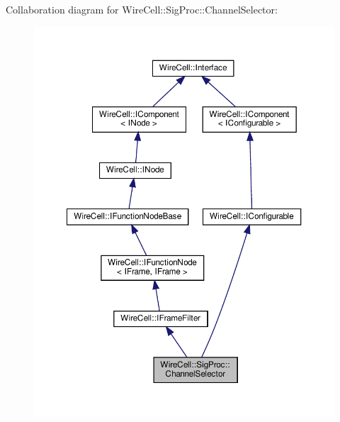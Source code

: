 Collaboration diagram for Wire\+Cell\+:\+:Sig\+Proc\+:\+:Channel\+Selector\+:
\nopagebreak
\begin{figure}[H]
\begin{center}
\leavevmode
\includegraphics[width=350pt]{class_wire_cell_1_1_sig_proc_1_1_channel_selector__coll__graph}
\end{center}
\end{figure}
